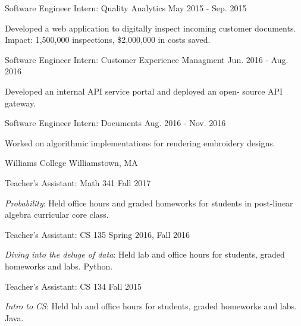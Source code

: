 \begin{cventries}
\cvexperiencebody
{Software Engineer Intern: Quality Analytics} %
{May 2015 - Sep. 2015} %
{
  \begin{cvitems} %
    \item {Developed a web application to digitally inspect incoming customer documents. Impact: 1,500,000 inspections, \$2,000,000 in costs saved.}
  \end{cvitems}
}
\cvexperiencebody
{Software Engineer Intern: Customer Experience Managment} %
{Jun. 2016 - Aug. 2016} %
{
  \begin{cvitems} %
    \item {Developed an internal API service portal and deployed an open- source API gateway.}
  \end{cvitems}
}
\cvexperiencebody
{Software Engineer Intern: Documents} %
{Aug. 2016 - Nov. 2016} %
{
  \begin{cvitems} %
    \item {Worked on algorithmic implementations for rendering embroidery designs.}
  \end{cvitems}
}
\smallskip
\cvexperienceheader
{Williams College}
{Williamstown, MA}

\cvexperiencebody
{Teacher's Assistant: Math 341}
{Fall 2017}
{\begin{cvitems}
\item \textit{Probability}: Held office hours and graded homeworks for students in post-linear algebra curricular core class.
\end{cvitems}}
\cvexperiencebody
{Teacher's Assistant: CS 135}
{Spring 2016, Fall 2016}
{\begin{cvitems}
\item \textit{Diving into the deluge of data}: Held lab and office hours for students, graded homeworks and labs. Python.
\end{cvitems}}
\cvexperiencebody
{Teacher's Assistant: CS 134}
{Fall 2015}
{\begin{cvitems}
\item \textit{Intro to CS}: Held lab and office hours for students, graded homeworks and labs. Java.
\end{cvitems}}



\end{cventries}

